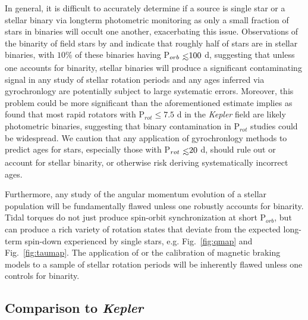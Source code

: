 \documentclass[twocolumn]{aastex61}
\def\lsim{~\rlap{$<$}{\lower 1.0ex\hbox{$\sim$}}}
\newcommand{\kepler}[0]{\textit{Kepler}\xspace}
\begin{document}
In general, it is difficult to accurately determine if a source is single star or a stellar binary via longterm photometric monitoring as only a small fraction of stars in binaries will occult one another, exacerbating this issue. Observations of the binarity of field stars by \citet{Raghavan2010} and \citet{Duchene2013} indicate that roughly half of stars are in stellar binaries, with $10\%$ of these binaries having P$_{orb} \lsim 100$ d, suggesting that unless one accounts for binarity, stellar binaries will produce a significant contaminating signal in any study of stellar rotation periods and any ages inferred via gyrochronlogy are potentially subject to large systematic errors.  Moreover, this problem could be more significant than the aforementioned estimate implies as \citet{Simonian2018} found that most rapid rotators with P$_{rot} \leq 7.5$ d in the \kepler field are likely photometric binaries, suggesting that binary contamination in P$_{rot}$ studies could be widespread. We caution that any application of gyrochronlogy methods to predict ages for stars, especially those with P$_{rot} \lsim 20$ d, should rule out or account for stellar binarity, or otherwise risk deriving systematically incorrect ages.

Furthermore, any study of the angular momentum evolution of a stellar population will be fundamentally flawed unless one robustly accounts for binarity.  Tidal torques do not just produce spin-orbit synchronization at short P$_{orb}$, but can produce a rich variety of rotation states that deviate from the expected long-term spin-down experienced by single stars, e.g. Fig.~\ref{fig:qmap} and Fig.~\ref{fig:taumap}. The application of or the calibration of magnetic braking models to a sample of stellar rotation periods will be inherently flawed unless one controls for binarity.   


\subsection{Comparison to \kepler} \label{sec:kepler}
\end{document}
